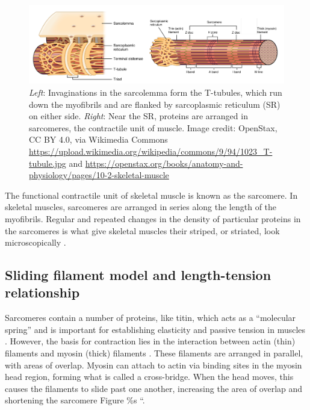 \documentclass{article}
\begin{document}
\begin{figure}[!htbp]
\centering
\includegraphics[width=1\linewidth]{files/EPpXta8zJdzN048lz8AR-9b5d94a6596a96b5f55dccb7a2f4bc59.png}
\caption[]{\textit{Left}: Invaginations in the sarcolemma form the T-tubules, which run down the myofibrils and are flanked by sarcoplasmic reticulum (SR) on either side. \textit{Right}: Near the SR, proteins are arranged in sarcomeres, the contractile unit of muscle. Image credit: OpenStax, CC BY 4.0, via Wikimedia Commons \href{https://upload.wikimedia.org/wikipedia/commons/9/94/1023\_T-tubule.jpg}{https://upload.wikimedia.org/wikipedia/commons/9/94/1023\_T-tubule.jpg} and \href{https://openstax.org/books/anatomy-and-physiology/pages/10-2-skeletal-muscle}{https://openstax.org/books/anatomy-and-physiology/pages/10-2-skeletal-muscle}}
\label{DsQecDsdW1}
\end{figure}

The functional contractile unit of skeletal muscle is known as the sarcomere. In skeletal muscles, sarcomeres are arranged in series along the length of the myofibrils. Regular and repeated changes in the density of particular proteins in the sarcomeres is what give skeletal muscles their striped, or striated, look microscopically \citep{Rall2018What}.

\subsection{Sliding filament model and length-tension relationship}

Sarcomeres contain a number of proteins, like titin, which acts as a ``molecular spring'' and is important for establishing elasticity and passive tension in muscles \citep{granzier2006giant}. However, the basis for contraction lies in the interaction between actin (thin) filaments and myosin (thick) filaments \citep{guyton2016book, openStax_contraction}. These filaments are arranged in parallel, with areas of overlap. Myosin can attach to actin via binding sites in the myosin head region, forming what is called a cross-bridge. When the head moves, this causes the filaments to slide past one another, increasing the area of overlap and shortening the sarcomere \citep{}Figure \%s ``.
\end{document}
